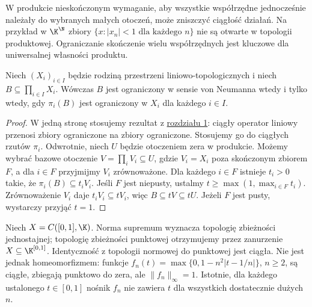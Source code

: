 \begin{uwaga}
W produkcie nieskończonym wymaganie, aby wszystkie
współrzędne jednocześnie należały do wybranych małych otoczeń,
może zniszczyć ciągłość działań. Na przykład w $\K^{\N}$
zbiory $\{x:|x_n|<1\text{ dla każdego }n\}$ nie są otwarte
w topologii produktowej. Ograniczanie skończenie wielu
współrzędnych jest kluczowe dla uniwersalnej własności produktu.
\end{uwaga}

\begin{twierdzenie}\label{thm:product-bounded}
Niech $(X_i)_{i\in I}$ będzie rodziną przestrzeni
liniowo-topologicznych i niech $B\subseteq\prod_{i\in I}X_i$.
Wówczas $B$ jest ograniczony w sensie von Neumanna wtedy
i tylko wtedy, gdy $\pi_i(B)$ jest ograniczony w $X_i$
dla każdego $i\in I$.
\end{twierdzenie}
\begin{proof}
W jedną stronę stosujemy rezultat z \hyperref[sec:tvs]{rozdziału 1}: ciągły operator liniowy
przenosi zbiory ograniczone na zbiory ograniczone. Stosujemy go do ciągłych rzutów $\pi_i$.
Odwrotnie, niech $U$ będzie otoczeniem zera w produkcie.
Możemy wybrać bazowe otoczenie $V=\prod_i V_i\subseteq U$,
gdzie $V_i=X_i$ poza skończonym zbiorem $F$, a dla $i\in F$
przyjmijmy $V_i$ zrównoważone. Dla każdego $i\in F$ istnieje
$t_i>0$ takie, że $\pi_i(B)\subseteq t_iV_i$.
Jeśli $F$ jest niepusty, ustalmy $t\geq\max(1,\max_{i\in F}t_i)$.
Zrównoważenie $V_i$ daje $t_iV_i\subseteq tV_i$, więc
$B\subseteq tV\subseteq tU$. Jeżeli $F$ jest pusty,
wystarczy przyjąć $t=1$.
\end{proof}

\begin{przyklad}
Niech $X=C([0,1],\K)$. Norma supremum wyznacza topologię
zbieżności jednostajnej; topologię zbieżności punktowej
otrzymujemy przez zanurzenie $X\subseteq\K^{[0,1]}$.
Identyczność z topologii normowej do punktowej jest ciągła.
Nie jest jednak homeomorfizmem: funkcje
$f_n(t)=\max\{0,1-n^2|t-1/n|\}$, $n\geq2$, są ciągłe,
zbiegają punktowo do zera, ale $\|f_n\|_\infty=1$.
Istotnie, dla każdego ustalonego $t\in[0,1]$ nośnik $f_n$
nie zawiera $t$ dla wszystkich dostatecznie dużych $n$.
\end{przyklad}

